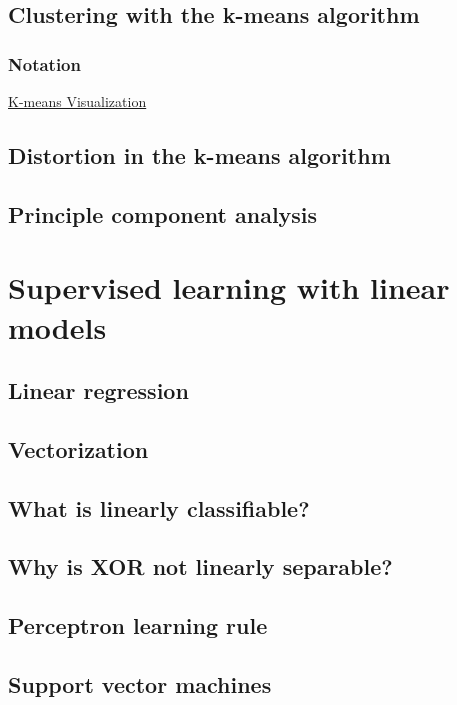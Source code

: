 \documentclass{article}
\begin{document}
    \subsection{Clustering with the k-means algorithm}
        \subsubsection{Notation}
            \href{http://shabal.in/visuals/kmeans/6.html}{K-means Visualization}


    \subsection{Distortion in the k-means algorithm}

    \subsection{Principle component analysis}

\section{Supervised learning with linear models}
    \subsection{Linear regression}

    \subsection{Vectorization}

    \subsection{What is linearly classifiable?}

    \subsection{Why is XOR not linearly separable?}

    \subsection{Perceptron learning rule}

    \subsection{Support vector machines}
\end{document}
